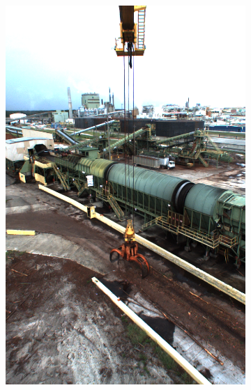 	\begin{figure}[h]
		\centering
		\begin{subfigure}[c]{0.24\textwidth}			
			\includegraphics[width=1\textwidth]{bilder/Grundlagen/Daten_Bildqualitaet/gut.png}
		\end{subfigure}
		\begin{subfigure}[c]{0.24\textwidth}			

\end{subfigure}
\end{figure}
